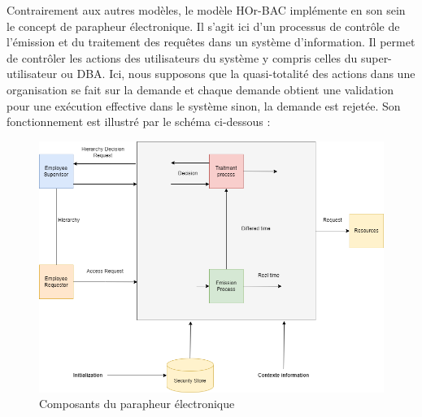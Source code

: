 \label{sectionArchitectureBOr-BAC}

Contrairement aux autres modèles, le modèle HOr-BAC implémente en son sein le concept de parapheur électronique. Il s'agit ici d'un processus de contrôle de l'émission et du traitement des requêtes dans un système d'information. Il permet de contrôler les actions des utilisateurs du système y compris celles du  super-utilisateur ou DBA. Ici, nous supposons que la quasi-totalité des actions dans une organisation se fait sur la demande et chaque demande obtient une validation pour une exécution effective dans le système sinon, la demande est rejetée. Son fonctionnement est illustré par le schéma ci-dessous :

\begin{figure}[h!]
    \centering
		\includegraphics[scale=4]{chap2/images/hor-bac.png}
    \caption{Composants du parapheur électronique}
	 \label{figHor-bac}
\end{figure} 

